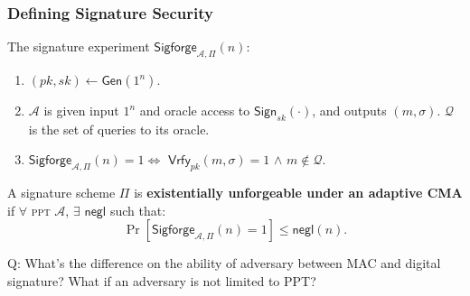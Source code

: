 \begin{frame}\frametitle{Defining Signature Security}
The signature experiment $\mathsf{Sigforge}_{\mathcal{A},\Pi }(n)$:
\begin{enumerate}
\item $(pk,sk) \gets \mathsf{Gen}(1^n)$.
\item $\mathcal{A}$ is given input $1^n$ and oracle access to $\mathsf{Sign}_{sk}(\cdot)$, and outputs $(m,\sigma)$. $\mathcal{Q}$ is the set of queries to its oracle.
\item $\mathsf{Sigforge}_{\mathcal{A},\Pi }(n)=1 \iff$ $\mathsf{Vrfy}_{pk}(m,\sigma)=1$ $\land$ $m \notin \mathcal{Q}$. 
\end{enumerate}
\begin{definition}
A signature scheme $\Pi$ is \textbf{existentially unforgeable under an adaptive CMA} if $\forall$ \textsc{ppt} $\mathcal{A}$, $\exists$ $\mathsf{negl}$ such that:
\[ \Pr [\mathsf{Sigforge}_{\mathcal{A},\Pi }(n)=1] \le \mathsf{negl}(n).
\]
\end{definition}
\begin{exampleblock}{Q: What's the difference on the ability of adversary between MAC and digital signature? What if an adversary is not limited to PPT?}
\end{exampleblock}
\end{frame}
